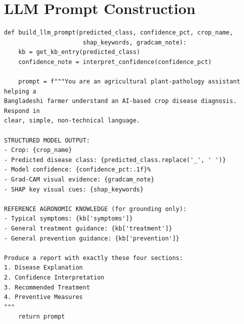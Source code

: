 \documentclass[12pt,a4paper,oneside]{report}
\begin{document}
\section{LLM Prompt Construction}
\begin{lstlisting}[caption={Automatic prompt construction from model prediction, confidence, and XAI-derived visual evidence.}]
def build_llm_prompt(predicted_class, confidence_pct, crop_name,
                      shap_keywords, gradcam_note):
    kb = get_kb_entry(predicted_class)
    confidence_note = interpret_confidence(confidence_pct)

    prompt = f"""You are an agricultural plant-pathology assistant helping a
Bangladeshi farmer understand an AI-based crop disease diagnosis. Respond in
clear, simple, non-technical language.

STRUCTURED MODEL OUTPUT:
- Crop: {crop_name}
- Predicted disease class: {predicted_class.replace('_', ' ')}
- Model confidence: {confidence_pct:.1f}%
- Grad-CAM visual evidence: {gradcam_note}
- SHAP key visual cues: {shap_keywords}

REFERENCE AGRONOMIC KNOWLEDGE (for grounding only):
- Typical symptoms: {kb['symptoms']}
- General treatment guidance: {kb['treatment']}
- General prevention guidance: {kb['prevention']}

Produce a report with exactly these four sections:
1. Disease Explanation
2. Confidence Interpretation
3. Recommended Treatment
4. Preventive Measures
"""
    return prompt
\end{lstlisting}
\end{document}

